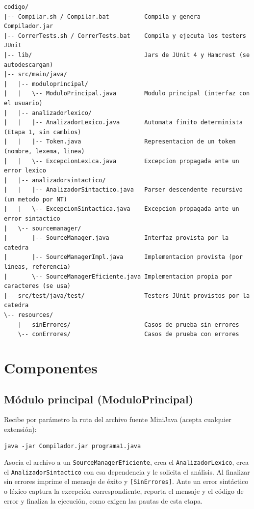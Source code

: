\documentclass[11pt,a4paper]{article}
\begin{document}
{\footnotesize
\begin{verbatim}
codigo/
|-- Compilar.sh / Compilar.bat          Compila y genera Compilador.jar
|-- CorrerTests.sh / CorrerTests.bat    Compila y ejecuta los testers JUnit
|-- lib/                                Jars de JUnit 4 y Hamcrest (se autodescargan)
|-- src/main/java/
|   |-- moduloprincipal/
|   |   \-- ModuloPrincipal.java        Modulo principal (interfaz con el usuario)
|   |-- analizadorlexico/
|   |   |-- AnalizadorLexico.java       Automata finito determinista (Etapa 1, sin cambios)
|   |   |-- Token.java                  Representacion de un token (nombre, lexema, linea)
|   |   \-- ExcepcionLexica.java        Excepcion propagada ante un error lexico
|   |-- analizadorsintactico/
|   |   |-- AnalizadorSintactico.java   Parser descendente recursivo (un metodo por NT)
|   |   \-- ExcepcionSintactica.java    Excepcion propagada ante un error sintactico
|   \-- sourcemanager/
|       |-- SourceManager.java          Interfaz provista por la catedra
|       |-- SourceManagerImpl.java      Implementacion provista (por lineas, referencia)
|       \-- SourceManagerEficiente.java Implementacion propia por caracteres (se usa)
|-- src/test/java/test/                 Testers JUnit provistos por la catedra
\-- resources/
    |-- sinErrores/                     Casos de prueba sin errores
    \-- conErrores/                     Casos de prueba con errores
\end{verbatim}
}

\section{Componentes}

\subsection{Módulo principal (ModuloPrincipal)}

Recibe por parámetro la ruta del archivo fuente MiniJava (acepta cualquier extensión):

\begin{verbatim}
java -jar Compilador.jar programa1.java
\end{verbatim}

Asocia el archivo a un \texttt{SourceManagerEficiente}, crea el \texttt{AnalizadorLexico},
crea el \texttt{AnalizadorSintactico} con esa dependencia y le solicita el análisis. Al
finalizar sin errores imprime el mensaje de éxito y \texttt{[SinErrores]}. Ante un error
sintáctico o léxico captura la excepción correspondiente, reporta el mensaje y el código de
error y finaliza la ejecución, como exigen las pautas de esta etapa.
\end{document}
